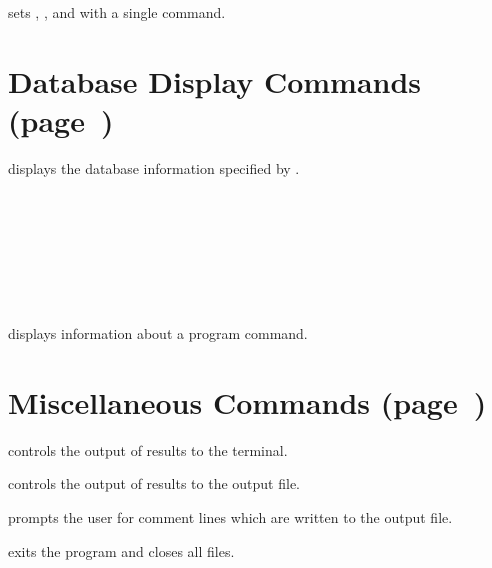  {
sets , , and  with a single command.
}

\section{Database Display Commands (page~\protect\pageref{cmd:display})}

 {
displays the database information specified by .

\cenlinesbegin
{}\\
\\
\\
\\
\\
\\
\cenlinesend
}

 {
displays information about a program command.
}

\section{Miscellaneous Commands (page~\protect\pageref{sec:misc})}

 {
controls the output of results to the terminal.
}

 {
controls the output of results to the output file.
}

 {
prompts the user for  comment lines which are written to
the output file.
}

 {
exits the program and closes all files.
}
